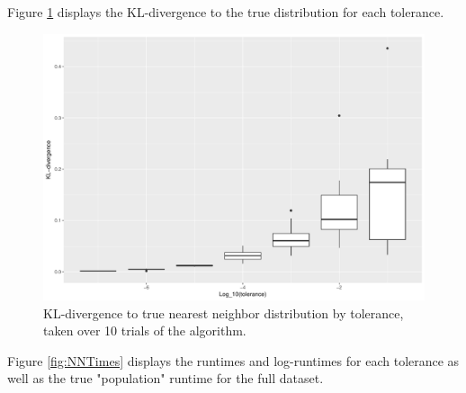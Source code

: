 \documentclass{article}
\begin{document}
Figure \ref{fig:NNDivergences} displays the KL-divergence to the true distribution for each tolerance.
\begin{figure}
    \includegraphics[width=\linewidth]{Figures/NearestNeighbor/CDR3/div_by_tol.pdf}
    \caption{KL-divergence to true nearest neighbor distribution by tolerance, taken over 10 trials of the algorithm.}
    \label{fig:NNDivergences}
\end{figure}
Figure \ref{fig:NNTimes} displays the runtimes and log-runtimes for each tolerance as well as the true "population" runtime for the full dataset.
\end{document}
